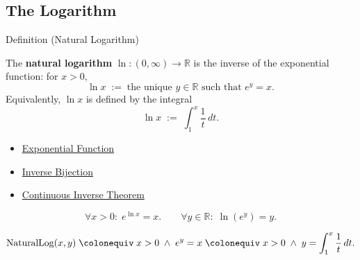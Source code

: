 
\subsection*{The Logarithm}
\label{sec:logarithmic}

\begin{definitionbox}{Definition (Natural Logarithm)}
\begin{definition}
\label{def:natural-logarithm}
The \textbf{natural logarithm} $\ln : (0,\infty) \to \mathbb{R}$ is
the inverse of the exponential function: for $x > 0$,
\[
  \ln x \;:=\; \text{the unique } y \in \mathbb{R}
  \text{ such that } e^y = x.
\]
Equivalently, $\ln x$ is defined by the integral
\[
  \ln x \;:=\; \int_1^x \frac{1}{t}\, dt.
\]
\end{definition}
\end{definitionbox}

\begin{dependencies}
\begin{itemize}
  \item \hyperref[def:exponential]{Exponential Function}
  \item \hyperref[prop:inverse-bijection]{Inverse Bijection}
  \item \hyperref[thm:continuous-inverse-theorem]{Continuous Inverse Theorem}
\end{itemize}
\end{dependencies}

\begin{remark*}
\[
  \forall x > 0 :\; e^{\ln x} = x.
  \qquad
  \forall y \in \mathbb{R} :\; \ln(e^y) = y.
\]
\end{remark*}

\begin{remark*}
\[
  \operatorname{NaturalLog}(x, y)
  \;\colonequiv\;
  x > 0 \;\wedge\; e^y = x
  \;\colonequiv\;
  x > 0 \;\wedge\; y = \int_1^x \frac{1}{t}\,dt.
\]
\end{remark*}

